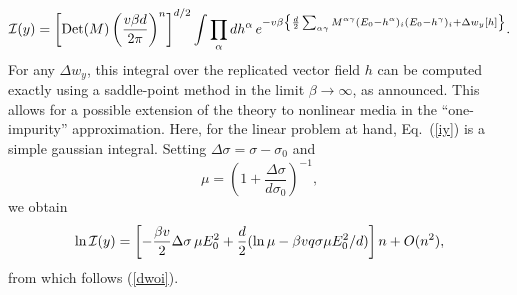 \begin{equation}
\label{iy}
{\cal I}(y)=\left[\mathop{\text{Det}}(M)\left(\frac{v\beta
d}{2\pi}\right)^n\right]^{d/2}\int \prod_\alpha dh^\alpha \,
e^{-v\beta\left\{{d\over 2}
\sum_{\alpha\gamma}M^{\alpha\gamma}(E_0-h^\alpha)_i
(E_0-h^\gamma)_i+\Delta w_y[h]\right\}}.
\end{equation}
For any $\Delta w_y$, this integral over the replicated vector field
$h$ can be computed exactly using a saddle-point method \cite{NEGE87}
in the limit $\beta\to\infty$, as announced. This allows for a
possible extension of the theory to nonlinear media in the
``one-impurity'' approximation. Here, for the linear problem at hand,
Eq.\ (\ref{iy}) is a simple gaussian integral. Setting
$\Delta\sigma=\sigma-\sigma_0$ and
\begin{equation}
\mu=\left(1+\frac{\Delta\sigma}{d\sigma_0}\right)^{-1},
\end{equation}
we obtain
\begin{equation}
\ln{\cal I}(y)=\left[-\frac{\beta v}{2}\Delta\sigma\,\mu E_0^2
+\frac{d}{2}(\ln \mu-\beta v q \sigma\mu E_0^2/d)\right]n+O(n^2),
\end{equation}
from which follows (\ref{dwoi}).

